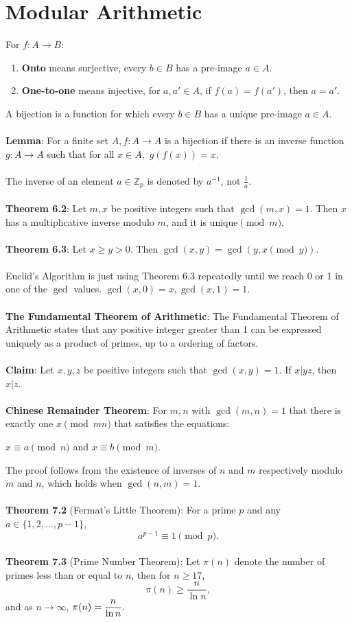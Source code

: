 \documentclass{article}
\theoremstyle{definition}
\begin{document}
\section*{Modular Arithmetic}
For $f: A \rightarrow B:$ \begin{enumerate}
    \item \textbf{Onto} means surjective, every $b \in B$ has a pre-image $a \in A$.
    \item \textbf{One-to-one} means injective, for $a, a' \in A$, if $f(a) = f(a')$, then $a = a'$.
\end{enumerate} $ $ \\
A bijection is a function for which every $b \in B$ has a unique pre-image $a \in A$. \\ \\
\textbf{Lemma}: For a finite set $A, f : A \rightarrow A$ is a bijection if there is an inverse function $g : A \rightarrow A$ such that for all $x \in A,$ $g(f(x)) = x$. \\ \\
The inverse of an element $a \in \mathbb{Z}_p$ is denoted by $a^{-1}$, not $\frac{1}{a}$. \\ \\
\textbf{Theorem 6.2}: Let $m, x$ be positive integers such that $\gcd(m, x) = 1$. Then $x$ has a multiplicative inverse modulo $m$, and it is unique$\pmod{m}$. \\ \\
\textbf{Theorem 6.3}: Let $x \geq y > 0$. Then $\gcd(x, y) = \gcd(y, x \pmod{y})$. \\ \\
Euclid's Algorithm is just using Theorem 6.3 repeatedly until we reach 0 or 1 in one of the $\gcd$ values. $\gcd(x, 0) = x, \gcd(x, 1) = 1$. \\ \\
\textbf{The Fundamental Theorem of Arithmetic}: The Fundamental Theorem of Arithmetic states that any positive integer greater than 1 can be expressed uniquely as a product of primes, up to a ordering of factors. \\ \\
\textbf{Claim}: Let $x, y, z$ be positive integers such that $\gcd(x, y) = 1$. If $x | yz$, then $x | z$. \\ \\
\textbf{Chinese Remainder Theorem}: For $m, n$ with $\gcd(m, n) = 1$ that there is exactly one $x \pmod{mn}$ that satisfies the equations: \begin{center}
$x \equiv a \pmod{n}$ and $x \equiv b \pmod{m}$.    
\end{center}
The proof follows from the existence of inverses of $n$ and $m$ respectively modulo $m$ and $n$, which holds when $\gcd(n, m) = 1$. \\ \\
\textbf{Theorem 7.2} (Fermat's Little Theorem): For a prime $p$ and any $a \in \{1, 2, \dots, p - 1\}$, $$a^{p - 1} \equiv 1 \pmod{p}.$$ \\
\textbf{Theorem 7.3} (Prime Number Theorem): Let $\pi(n)$ denote the number of primes less than or equal to $n$, then for $n \geq 17$, $$\pi(n) \geq \frac{n}{\ln{n}},$$ and as $n \rightarrow \infty$, $\pi(n) = \mathlarger{\frac{n}{\ln{n}}}.$
\end{document}
